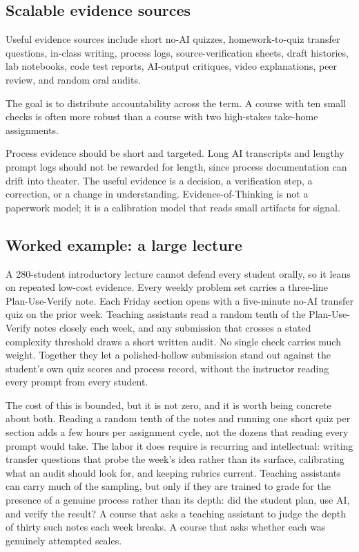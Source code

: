 \documentclass{SIAMbook2023}
\begin{document}
\subsection{Scalable evidence sources}
\label{i:subsec:scalable-evidence}%

Useful evidence sources include short no-AI quizzes, homework-to-quiz transfer questions, in-class writing, process logs, source-verification sheets, draft histories, lab notebooks, code test reports, AI-output critiques, video explanations, peer review, and random oral audits.

The goal is to distribute accountability across the term. A course with ten small checks is often more robust than a course with two high-stakes take-home assignments.

Process evidence should be short and targeted. Long AI transcripts and lengthy prompt logs should not be rewarded for length, since process documentation can drift into theater. The useful evidence is a decision, a verification step, a correction, or a change in understanding. Evidence-of-Thinking is not a paperwork model; it is a calibration model that reads small artifacts for signal.

\subsection{Worked example: a large lecture}
\label{i:subsec:evidence-worked-example}

A 280-student introductory lecture cannot defend every student orally, so it leans on repeated low-cost evidence. Every weekly problem set carries a three-line Plan-Use-Verify note. Each Friday section opens with a five-minute no-AI transfer quiz on the prior week. Teaching assistants read a random tenth of the Plan-Use-Verify notes closely each week, and any submission that crosses a stated complexity threshold draws a short written audit. No single check carries much weight. Together they let a polished-hollow submission stand out against the student's own quiz scores and process record, without the instructor reading every prompt from every student.

The cost of this is bounded, but it is not zero, and it is worth being concrete about both. Reading a random tenth of the notes and running one short quiz per section adds a few hours per assignment cycle, not the dozens that reading every prompt would take. The labor it does require is recurring and intellectual: writing transfer questions that probe the week's idea rather than its surface, calibrating what an audit should look for, and keeping rubrics current. Teaching assistants can carry much of the sampling, but only if they are trained to grade for the presence of a genuine process rather than its depth: did the student plan, use AI, and verify the result? A course that asks a teaching assistant to judge the depth of thirty such notes each week breaks. A course that asks whether each was genuinely attempted scales.
\end{document}
